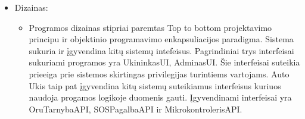 \documentclass[oneside]{VUMIFPSkursinis}
\begin{document}
	\begin{itemize}
		\item Dizainas:
		\begin{itemize}
			\item Programos dizainas stipriai paremtas Top to bottom projektavimo principu ir objektinio programavimo enkapsuliacijos paradigma. Sistema sukuria ir įgyvendina kitų sistemų intefeisus. Pagrindiniai trys interfeisai sukuriami programos yra UkininkasUI, AdminasUI. Šie interfeisai suteikia prieeiga prie sistemos skirtingas privilegijas turintiems vartojams. Auto Ukis taip pat įgyvendina kitų sistemų suteikiamus interfeisus kuriuos naudoja progamos logikoje duomenis gauti. Įgyvendinami interfeisai yra OruTarnybaAPI, SOSPagalbaAPI ir MikrokontrolerisAPI.
		\end{itemize}
	\end{itemize}
\end{document}
